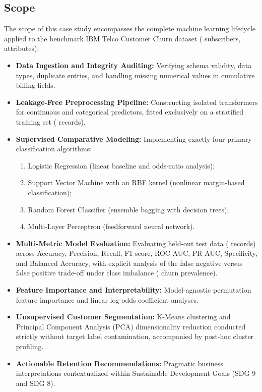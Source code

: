 \subsection{Scope}
The scope of this case study encompasses the complete machine learning lifecycle applied to the benchmark IBM Telco Customer Churn dataset (\datasetTotalRows{} subscribers, \datasetTotalCols{} attributes):
\begin{itemize}
    \item \textbf{Data Ingestion and Integrity Auditing:} Verifying schema validity, data types, duplicate entries, and handling missing numerical values in cumulative billing fields.
    \item \textbf{Leakage-Free Preprocessing Pipeline:} Constructing isolated transformers for continuous and categorical predictors, fitted exclusively on a stratified training set (\datasetTrainCount{} records).
    \item \textbf{Supervised Comparative Modeling:} Implementing exactly four primary classification algorithms:
    \begin{enumerate}
        \item Logistic Regression (linear baseline and odds-ratio analysis);
        \item Support Vector Machine with an RBF kernel (nonlinear margin-based classification);
        \item Random Forest Classifier (ensemble bagging with decision trees);
        \item Multi-Layer Perceptron (feedforward neural network).
    \end{enumerate}
    \item \textbf{Multi-Metric Model Evaluation:} Evaluating held-out test data (\datasetTestCount{} records) across Accuracy, Precision, Recall, F1-score, ROC-AUC, PR-AUC, Specificity, and Balanced Accuracy, with explicit analysis of the false negative versus false positive trade-off under class imbalance (\datasetChurnProportion{} churn prevalence).
    \item \textbf{Feature Importance and Interpretability:} Model-agnostic permutation feature importance and linear log-odds coefficient analyses.
    \item \textbf{Unsupervised Customer Segmentation:} K-Means clustering and Principal Component Analysis (PCA) dimensionality reduction conducted strictly without target label contamination, accompanied by post-hoc cluster profiling.
    \item \textbf{Actionable Retention Recommendations:} Pragmatic business interpretations contextualized within Sustainable Development Goals (SDG 9 and SDG 8).
\end{itemize}
